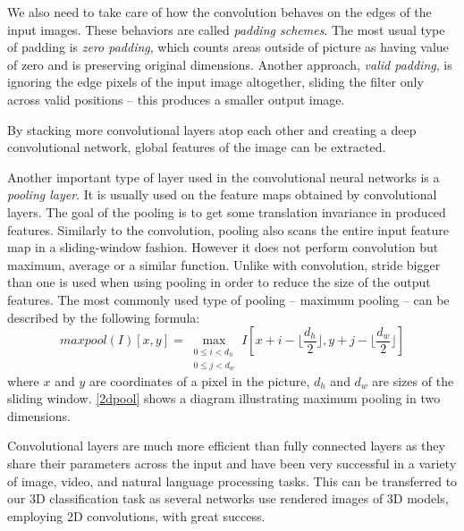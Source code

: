 

We also need to take care of how the convolution behaves on the edges of the input images. These behaviors are called \textit{padding schemes}. The most usual type of padding is \textit{zero padding}, which counts areas outside of picture as having value of zero and is preserving original dimensions. Another approach, \textit{valid padding}, is ignoring the edge pixels of the input image altogether, sliding the filter only across valid positions -- this produces a smaller output image. \par
By stacking more convolutional layers atop each other and creating a deep convolutional network,  global features of the image can be extracted. 
\par
Another important type of layer used in the convolutional neural networks is a \textit{pooling layer}. It is usually used on the feature maps obtained by convolutional layers. The goal of the pooling is to get some translation invariance in produced features. Similarly to the convolution, pooling also scans the entire input feature map in a sliding-window fashion. However it does not perform convolution but maximum, average or a similar function. Unlike with convolution, stride bigger than one is used when using pooling in order to reduce the size of the output features.
The most commonly used type of pooling -- maximum pooling -- can be described by the following formula: 
$$maxpool(I)[x,y] =
\max_{\substack{0 \leq i < d_h\\
		0 \leq j < d_w}}
I[x + i - \lfloor \frac{d_h}{2} \rfloor, y + j - \lfloor \frac{d_w}{2}  \rfloor ] $$ where $x$ and $y$ are coordinates of a pixel in the picture, $d_h$ and $d_w$ are sizes of the sliding window. \autoref{2dpool} shows a diagram illustrating maximum pooling in two dimensions.\par
Convolutional layers are much more efficient than fully connected layers as they share their parameters across the input and have been very successful in a variety of image, video, and natural language processing tasks. This  can be transferred to our 3D classification task as several networks use rendered images of 3D models, employing 2D convolutions, with great success. 



